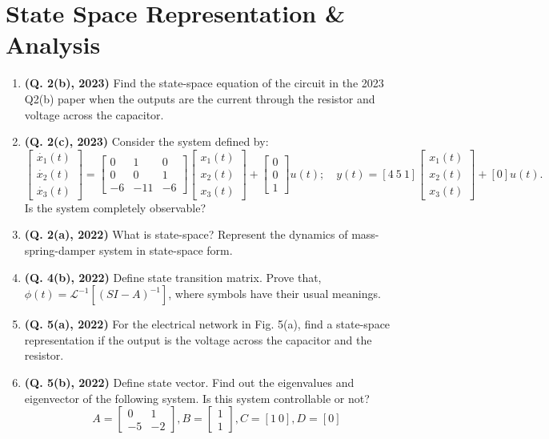 \documentclass[12pt, a4paper]{article}
\begin{document}
	\section{State Space Representation \& Analysis}
	\begin{enumerate}
		\item \textbf{(Q. 2(b), 2023)} Find the state-space equation of the circuit in the 2023 Q2(b) paper when the outputs are the current through the resistor and voltage across the capacitor.
		\item \textbf{(Q. 2(c), 2023)} Consider the system defined by:
		\[ \begin{bmatrix} \dot{x_1}(t) \\ \dot{x_2}(t) \\ \dot{x_3}(t) \end{bmatrix} = \begin{bmatrix} 0 & 1 & 0 \\ 0 & 0 & 1 \\ -6 & -11 & -6 \end{bmatrix} \begin{bmatrix} x_1(t) \\ x_2(t) \\ x_3(t) \end{bmatrix} + \begin{bmatrix} 0 \\ 0 \\ 1 \end{bmatrix} u(t); \quad y(t)=[4 \ 5 \ 1] \begin{bmatrix} x_1(t) \\ x_2(t) \\ x_3(t) \end{bmatrix} + [0]u(t). \]
		Is the system completely observable?
		\item \textbf{(Q. 2(a), 2022)} What is state-space? Represent the dynamics of mass-spring-damper system in state-space form.
		\item \textbf{(Q. 4(b), 2022)} Define state transition matrix. Prove that, $\phi(t) = \mathcal{L}^{-1}[(SI - A)^{-1}]$, where symbols have their usual meanings.
		\item \textbf{(Q. 5(a), 2022)} For the electrical network in Fig. 5(a), find a state-space representation if the output is the voltage across the capacitor and the resistor.
		\item \textbf{(Q. 5(b), 2022)} Define state vector. Find out the eigenvalues and eigenvector of the following system. Is this system controllable or not?
		\[ A = \begin{bmatrix} 0 & 1 \\ -5 & -2 \end{bmatrix}, B = \begin{bmatrix} 1 \\ 1 \end{bmatrix}, C = [1 \ 0], D = [0] \]

\end{enumerate}
\end{document}
